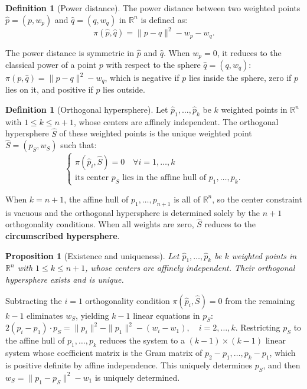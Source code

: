 \documentclass[12pt]{article}
\makeatletter
\newtheorem{proposition}[theorem]{Proposition}
\theoremstyle{definition}
\newtheorem{definition}[theorem]{Definition}
\theoremstyle{remark}
\renewenvironment{proof}[1][\proofname]{\par
  \pushQED{\qed}%
  \normalfont \footnotesize \topsep6\p@\@plus6\p@\relax
  \list{}{\leftmargin=2em
          \settowidth{\itemindent}{\itshape#1}%
          \labelwidth=\itemindent
          \parsep=0pt \listparindent=\parindent 
  }
  \item[\hskip\labelsep
        \itshape
    #1\@addpunct{.}]\ignorespaces
}{%
  \popQED\endlist\@endpefalse
}
\makeatother
\begin{document}
\begin{definition}[Power distance]
The power distance between two weighted points $\hat p = (p, w_p)$ and $\hat q = (q, w_q)$ 
in $\mathbb{R}^n$ is defined as:
\begin{equation*}
\pi(\hat p, \hat q) = \|p - q\|^2 - w_p - w_q .
\end{equation*}
\end{definition}

The power distance is symmetric in $\hat p$ and $\hat q$. When $w_p = 0$, 
it reduces to the classical power of a point $p$ with respect to the sphere 
$\hat q = (q, w_q)$: $ \pi(p, \hat q) = \|p - q\|^2 - w_q $,
which is negative if $p$ lies inside the sphere, zero if $p$ lies on it, and 
positive if $p$ lies outside.



\begin{definition}[Orthogonal hypersphere]
Let $\hat p_1, \ldots, \hat p_{k}$ be $k$ weighted points in $\mathbb{R}^n$ 
with $1 \leq k \leq n+1$, whose centers are affinely independent. The orthogonal hypersphere $\hat S$ of these weighted points is the unique weighted point $\hat S = (p_S, w_S)$ such that:
\begin{equation*}
\begin{cases}
    \pi(\hat p_i, \hat S) = 0 \quad \forall i = 1, \ldots, k \\
    \text{its center $p_S$ lies in the affine hull of $p_1, \ldots, p_{k}$.}
\end{cases}   
\end{equation*}

\end{definition}

When $k = n+1$, the affine hull of $p_1, \ldots, p_{n+1}$ is all of $\mathbb{R}^n$, so the center constraint is vacuous and the orthogonal hypersphere is determined solely by the $n+1$ orthogonality conditions. When all weights are zero, $\hat S$ reduces to the \textbf{circumscribed hypersphere}.

\begin{proposition}[Existence and uniqueness]
Let $\hat p_1, \ldots, \hat p_k$ be $k$ weighted points in $\mathbb{R}^n$ with $1 \leq k \leq n+1$, whose centers are affinely independent. Their orthogonal hypersphere exists and is unique.
\end{proposition}
\begin{proof}
Subtracting the $i=1$ orthogonality condition $\pi(\hat p_i, \hat S) = 0$ 
from the remaining $k-1$ eliminates $w_S$, yielding $k-1$ linear equations in $p_S$:
$
2(p_i - p_1) \cdot p_S = \|p_i\|^2 - \|p_1\|^2 - (w_i - w_1), \quad i = 2, \ldots, k.
$
Restricting $p_S$ to the affine hull of $p_1, \ldots, p_k$ reduces the system 
to a $(k-1)\times(k-1)$ linear system whose coefficient matrix is the Gram matrix 
of $p_2 - p_1, \ldots, p_k - p_1$, which is positive definite by affine 
independence. This uniquely determines $p_S$, and then $w_S = \|p_1 - p_S\|^2 - w_1$ 
is uniquely determined.
\end{proof}
\end{document}
